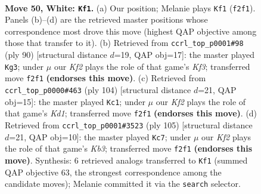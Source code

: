 \documentclass[11pt]{article}
\begin{document}
\clearpage

\begin{figure}[p]\centering
\begin{subfigure}{0.46\textwidth}\centering
\resizebox{\linewidth}{!}{%
\newchessgame
\chessboard[
  setfen={4k3/1R6/8/pp4r1/b1p5/P1P5/1B3K2/8 w - - 6 50},
  showmover=false,
  pgfstyle=straightmove, color=movearrow, markmove={f2-f1}
]}
\caption{}
\end{subfigure}\hfill
\begin{subfigure}{0.46\textwidth}\centering
\resizebox{\linewidth}{!}{%
\newchessgame
\chessboard[
  setfen={8/2kp4/8/r4p2/1p3P2/1Bb2K2/P7/3R4 w - - 19 46},
  showmover=false,
  pgfstyle=straightmove, color=movearrow, markmove={f3-g3}
]}
\caption{}
\end{subfigure}
\\[4pt]
\begin{subfigure}{0.46\textwidth}\centering
\resizebox{\linewidth}{!}{%
\newchessgame
\chessboard[
  setfen={3B4/1p3R2/8/P2p4/3Pb1k1/8/1r6/3K4 w - - 11 53},
  showmover=false,
  pgfstyle=straightmove, color=movearrow, markmove={d1-c1}
]}
\caption{}
\end{subfigure}\hfill
\begin{subfigure}{0.46\textwidth}\centering
\resizebox{\linewidth}{!}{%
\newchessgame
\chessboard[
  setfen={8/8/1k2p3/2p5/2P3b1/1P5r/1KB2R2/8 b - - 7 53},
  showmover=false,
  pgfstyle=straightmove, color=movearrow, markmove={b6-c7}
]}
\caption{}
\end{subfigure}
\caption{\textbf{Move 50, White: \texttt{Kf1}.} (a) Our position; Melanie plays \texttt{Kf1} (\texttt{f2f1}). Panels (b)--(d) are the retrieved master positions whose correspondence most drove this move (highest QAP objective among those that transfer to it). (b) Retrieved from \texttt{ccrl\_top\_p0001\#98} (ply 90) [structural distance $d$=19, QAP obj=17]: the master played \texttt{Kg3}; under $\mu$ our \emph{Kf2} plays the role of that game's \emph{Kf3}; transferred move \texttt{f2f1} \textbf{(endorses this move)}. (c) Retrieved from \texttt{ccrl\_top\_p0000\#463} (ply 104) [structural distance $d$=21, QAP obj=15]: the master played \texttt{Kc1}; under $\mu$ our \emph{Kf2} plays the role of that game's \emph{Kd1}; transferred move \texttt{f2f1} \textbf{(endorses this move)}. (d) Retrieved from \texttt{ccrl\_top\_p0001\#3523} (ply 105) [structural distance $d$=21, QAP obj=10]: the master played \texttt{Kc7}; under $\mu$ our \emph{Kf2} plays the role of that game's \emph{Kb3}; transferred move \texttt{f2f1} \textbf{(endorses this move)}. Synthesis: 6 retrieved analogs transferred to \texttt{Kf1} (summed QAP objective 63, the strongest correspondence among the candidate moves); Melanie committed it via the \texttt{search} selector.}
\label{fig:thought-m98}
\end{figure}
\end{document}
